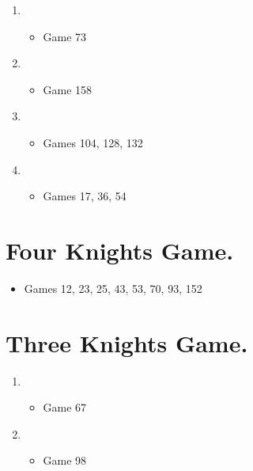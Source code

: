 \begin{enumerate}
\begin{enumerate}
\item {}
\begin{itemize}
\item Game 73
\end{itemize}

\item {}
\begin{itemize}
\item Game 158
\end{itemize}

\item {}
\begin{itemize}
\item Games 104, 128, 132
\end{itemize}

\item {}
\begin{itemize}
\item Games 17, 36, 54
\end{itemize}

\end{enumerate}
\end{enumerate}

\section{Four Knights Game.}  
\newgame{}
\begin{itemize}
\item Games 12, 23, 25, 43, 53, 70, 93, 152
\end{itemize}

\section{Three Knights Game.} 
\newgame{}
\begin{enumerate}
\item {}
\begin{itemize}
\item Game 67
\end{itemize}
\item {}
\begin{itemize}
\item Game 98
\end{itemize}
\end{enumerate}

